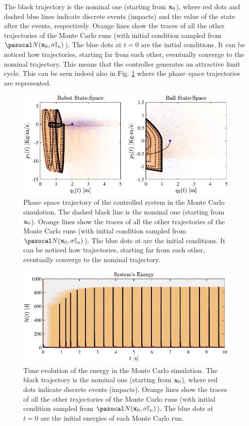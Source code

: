 %
The black trajectory is the nominal one (starting from $\mathbf{x}_0$), where red dots and dashed blue lines indicate discrete events (impacts) and the value of the state after the events, respectively. Orange lines show the traces of all the other trajectories of the Monte Carlo runs (with initial condition sampled from $\N(\xb_0,\sigma\mathbb{I}_n)$). The blue dots at $t=0$ are the initial conditions. It can be noticed how trajectories, starting far from each other, eventually converge to the nominal trajectory. This means that the controller generates an attractive limit cycle. This can be seen indeed also in Fig. \ref{fig:reg2} where the phase--space trajectories are represented.
%
\begin{figure}[h]
    \centering
    \includegraphics[width = \linewidth]{Figures/reg2.pdf}
    \caption[Phase--space trajectory of the controlled system in the Monte Carlo simulation]{Phase--space trajectory of the controlled system in the Monte Carlo simulation. The dashed black line is the nominal one (starting from $\mathbf{x}_0$). Orange lines show the traces of all the other trajectories of the Monte Carlo runs (with initial condition sampled from $\N(\xb_0,\sigma\mathbb{I}_n)$). The blue dots at are the initial conditions. It can be noticed how trajectories, starting far from each other, eventually converge to the nominal trajectory.}
    \label{fig:reg2}
\end{figure}
%
\begin{figure}[!h]
    \centering
    \includegraphics[width = \linewidth]{Figures/reg3.pdf}
    \caption[Time evolution of the energy in the Monte Carlo simulation]{Time evolution of the energy in the Monte Carlo simulation. The black trajectory is the nominal one (starting from $\mathbf{x}_0$), where red dots indicate discrete events (impacts). Orange lines show the traces of all the other trajectories of the Monte Carlo runs (with initial condition sampled from $\N(\xb_0,\sigma\mathbb{I}_n)$). The blue dots at $t=0$ are the initial energies of each Monte Carlo run.}
    \label{fig:reg3}
\end{figure}

